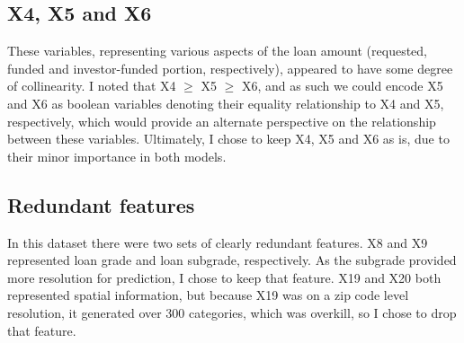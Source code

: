 \documentclass[12pt]{article}
\begin{document}
\subsection{X4, X5 and X6} %
\label{sub:x4_x5_and_x6}
These variables, representing various aspects of the loan amount (requested, funded and investor-funded portion, respectively), appeared to have some degree of collinearity. 
I noted that X4 $\geq$ X5 $\geq$ X6, and as such we could encode X5 and X6 as boolean variables denoting their equality relationship to X4 and X5, respectively, which would provide an alternate perspective on the relationship between these variables.
Ultimately, I chose to keep X4, X5 and X6 as is, due to their minor importance in both models.

\subsection{Redundant features} %
\label{sub:redundant_features}
In this dataset there were two sets of clearly redundant features. 
X8 and X9 represented loan grade and loan subgrade, respectively. As the subgrade provided more resolution for prediction, I chose to keep that feature.
X19 and X20 both represented spatial information, but because X19 was on a zip code level resolution, it generated over 300 categories, which was overkill, so I chose to drop that feature.

\end{document}
